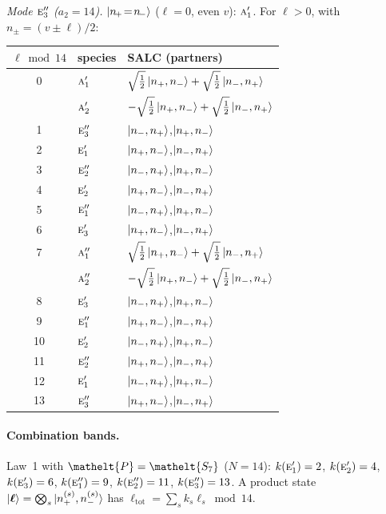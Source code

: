 \documentclass[11pt]{article}
\newcommand{\eltfont}[1]{{\let\sigma\eltsigma\mathelt{#1}}}
\newcommand{\irr}[1]{\text{\normalfont\scshape #1}}
\newcommand{\elt}[1]{\eltfont{#1}}
\newcommand{\pel}{\elt{P}}             %
\begin{document}
\emph{Mode $\irr{e}_{3}''$ ($a_2=14$).} $\ket{n_{\!+}\!=\!n_{\!-}}$ ($\ell=0$, even $v$): $\irr{a}_{1}'$. For $\ell>0$, with $n_\pm=(v\pm\ell)/2$:
\begin{longtable}{c l l}\hline $\ell\bmod 14$ & species & SALC (partners)\\ \hline\endhead
0 & $\irr{a}_{1}'$ & $\sqrt{\tfrac{1}{2}}\ket{n_+,n_-}+\sqrt{\tfrac{1}{2}}\ket{n_-,n_+}$\\
 & $\irr{a}_{2}'$ & $-\sqrt{\tfrac{1}{2}}\ket{n_+,n_-}+\sqrt{\tfrac{1}{2}}\ket{n_-,n_+}$\\
1 & $\irr{e}_{3}''$ & $\ket{n_-,n_+}$,\quad $\ket{n_+,n_-}$\\
2 & $\irr{e}_{1}'$ & $\ket{n_+,n_-}$,\quad $\ket{n_-,n_+}$\\
3 & $\irr{e}_{2}''$ & $\ket{n_-,n_+}$,\quad $\ket{n_+,n_-}$\\
4 & $\irr{e}_{2}'$ & $\ket{n_+,n_-}$,\quad $\ket{n_-,n_+}$\\
5 & $\irr{e}_{1}''$ & $\ket{n_-,n_+}$,\quad $\ket{n_+,n_-}$\\
6 & $\irr{e}_{3}'$ & $\ket{n_+,n_-}$,\quad $\ket{n_-,n_+}$\\
7 & $\irr{a}_{1}''$ & $\sqrt{\tfrac{1}{2}}\ket{n_+,n_-}+\sqrt{\tfrac{1}{2}}\ket{n_-,n_+}$\\
 & $\irr{a}_{2}''$ & $-\sqrt{\tfrac{1}{2}}\ket{n_+,n_-}+\sqrt{\tfrac{1}{2}}\ket{n_-,n_+}$\\
8 & $\irr{e}_{3}'$ & $\ket{n_-,n_+}$,\quad $\ket{n_+,n_-}$\\
9 & $\irr{e}_{1}''$ & $\ket{n_+,n_-}$,\quad $\ket{n_-,n_+}$\\
10 & $\irr{e}_{2}'$ & $\ket{n_-,n_+}$,\quad $\ket{n_+,n_-}$\\
11 & $\irr{e}_{2}''$ & $\ket{n_+,n_-}$,\quad $\ket{n_-,n_+}$\\
12 & $\irr{e}_{1}'$ & $\ket{n_-,n_+}$,\quad $\ket{n_+,n_-}$\\
13 & $\irr{e}_{3}''$ & $\ket{n_+,n_-}$,\quad $\ket{n_-,n_+}$\\
\hline\end{longtable}

\paragraph{Combination bands.}

Law~1 with $\pel=\elt{S_{7}}$ ($N=14$): $k(\irr{e}_{1}')=2$, $k(\irr{e}_{2}')=4$, $k(\irr{e}_{3}')=6$, $k(\irr{e}_{1}'')=9$, $k(\irr{e}_{2}'')=11$, $k(\irr{e}_{3}'')=13$. A product state $\ket{\boldsymbol\ell}=\bigotimes_s\ket{n_+^{(s)},n_-^{(s)}}$ has $\ell_{\mathrm{tot}}=\sum_sk_s\ell_s\bmod 14$.
\end{document}
